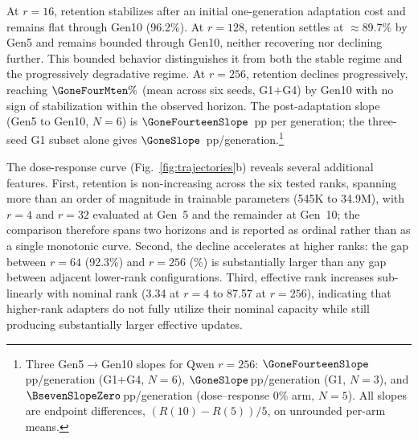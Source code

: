 \documentclass[a4paper,fleqn]{cas-dc}
\newif\ifshowchanges
\newcommand{\rev}[1]{\ifshowchanges{\color{blue}#1}\else{#1}\fi}
\begin{document}
At $r=16$, retention stabilizes after
an initial one-generation adaptation cost and remains flat through Gen10
(96.2\%). At $r=128$, retention settles at
$\approx$89.7\% by Gen5 and remains bounded through Gen10, neither
recovering nor declining further. This bounded behavior distinguishes it from
both the stable regime and the progressively degradative regime. At
$r=256$, retention declines progressively,
reaching \rev{$\GoneFourMten\%$} (mean across \rev{six seeds, G1$+$G4}) by Gen10 with no sign of
stabilization within the observed horizon. The post-adaptation slope
\rev{(Gen5 to Gen10, $N=6$) is $\GoneFourteenSlope$~pp per generation; the three-seed G1 subset alone gives $\GoneSlope$~pp/generation.}\footnote{\rev{Three Gen5$\to$Gen10 slopes for Qwen $r=256$: $\GoneFourteenSlope$\,pp/generation (G1+G4, $N=6$), $\GoneSlope$\,pp/generation (G1, $N=3$), and $\BsevenSlopeZero$\,pp/generation (dose--response 0\% arm, $N=5$). All slopes are endpoint differences, $(R(10)-R(5))/5$, on unrounded per-arm means.}}

The dose-response curve (Fig.~\ref{fig:trajectories}b) reveals several
additional features. First, \rev{retention is non-increasing across the six tested ranks, spanning more than an order of magnitude in trainable parameters (545K to 34.9M), with $r=4$ and $r=32$ evaluated at Gen~5 and the remainder at Gen~10; the comparison therefore spans two horizons and is reported as ordinal rather than as a single monotonic curve}. Second, the
decline accelerates at higher ranks: the gap between $r=64$ (92.3\%) and $r=256$
(\GoneMten\%) is substantially larger than any gap between adjacent lower-rank
configurations. Third, effective rank increases sub-linearly with nominal rank
(3.34 at $r=4$ to 87.57 at $r=256$), indicating that higher-rank adapters do not
fully utilize their nominal capacity while still producing substantially larger
effective updates.
\end{document}
